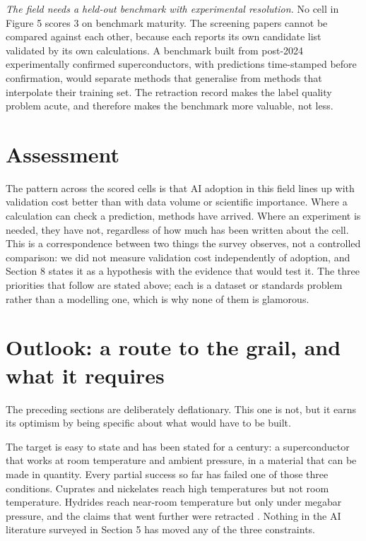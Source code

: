 \documentclass[
  11pt,
]{article}
\newcounter{none} %
\begin{document}
\emph{The field needs a held-out benchmark with experimental
resolution.} No cell in Figure 5 scores 3 on benchmark maturity. The
screening papers cannot be compared against each other, because each
reports its own candidate list validated by its own calculations. A
benchmark built from post-2024 experimentally confirmed superconductors,
with predictions time-stamped before confirmation, would separate
methods that generalise from methods that interpolate their training
set. The retraction record
\citep{snider2020retracted, dasenbrock2023retracted} makes the label
quality problem acute, and therefore makes the benchmark more valuable,
not less.

\section{Assessment}\label{assessment-3}

The pattern across the scored cells is that AI adoption in this field
lines up with validation cost better than with data volume or scientific
importance. Where a calculation can check a prediction, methods have
arrived. Where an experiment is needed, they have not, regardless of how
much has been written about the cell. This is a correspondence between
two things the survey observes, not a controlled comparison: we did not
measure validation cost independently of adoption, and Section 8 states
it as a hypothesis with the evidence that would test it. The three
priorities that follow are stated above; each is a dataset or standards
problem rather than a modelling one, which is why none of them is
glamorous.

\section{Outlook: a route to the grail, and what it
requires}\label{outlook-a-route-to-the-grail-and-what-it-requires}

The preceding sections are deliberately deflationary. This one is not,
but it earns its optimism by being specific about what would have to be
built.

The target is easy to state and has been stated for a century: a
superconductor that works at room temperature and ambient pressure, in a
material that can be made in quantity. Every partial success so far has
failed one of those three conditions. Cuprates and nickelates reach high
temperatures but not room temperature. Hydrides reach near-room
temperature but only under megabar pressure, and the claims that went
further were retracted
\citep{snider2020retracted, dasenbrock2023retracted}. Nothing in the AI
literature surveyed in Section 5 has moved any of the three constraints.
\end{document}
